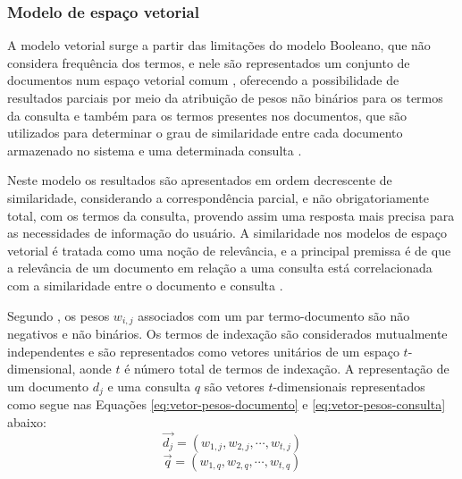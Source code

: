 \subsubsection{Modelo de espaço vetorial} \label{subsubsec:Modelo-espaço-vetorial}



    A modelo vetorial surge a partir das limitações do modelo Booleano, que não considera frequência dos termos, e nele são representados um conjunto de documentos num espaço vetorial comum \cite[p.~110]{Manning2008IIR}, oferecendo a possibilidade de resultados parciais por meio da atribuição de pesos não binários para os termos da consulta e também para os termos presentes nos documentos, que são utilizados para determinar o grau de similaridade entre cada documento armazenado no sistema e uma determinada consulta \cite[p.~77]{Baeza-Yates2011}.
    
    Neste modelo os resultados são apresentados em ordem decrescente de similaridade, considerando a correspondência parcial, e não obrigatoriamente total, com os termos da consulta, provendo assim uma resposta mais precisa para as necessidades de informação do usuário.
    A similaridade nos modelos de espaço vetorial é tratada como uma noção de relevância, e a principal premissa é de que a relevância de um documento em relação a uma consulta está correlacionada com a similaridade entre o documento e consulta \cite[p.~110]{Zhai2016TDMA}.
    
    Segundo , os pesos $w_{i,j}$ associados com um par termo-documento são não negativos e não binários.
    Os termos de indexação são considerados mutualmente independentes e são representados como vetores unitários de um espaço $t$-dimensional, aonde $t$ é número total de termos de indexação.
    A representação de um documento $d_j$ e uma consulta $q$ são vetores $t$-dimensionais representados como segue nas Equações \ref{eq:vetor-pesos-documento} e \ref{eq:vetor-pesos-consulta} abaixo:
    \begin{equation}
        \label{eq:vetor-pesos-documento}
		\vec{d_j} = (w_{1,j}, w_{2,j}, \cdots , w_{t,j})
    \end{equation}
    \begin{equation}
        \label{eq:vetor-pesos-consulta}
		\vec{q} = (w_{1,q}, w_{2,q}, \cdots , w_{t,q})
    \end{equation}
    
